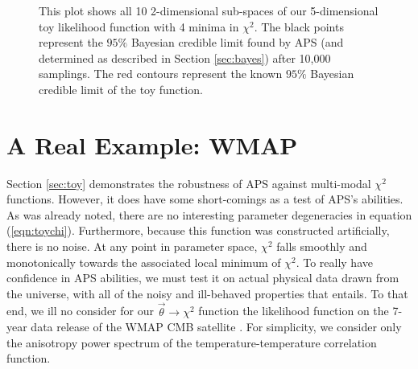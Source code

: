 \documentclass[useAMS,usenatbib]{aastex}
\begin{document}
\begin{figure*}
\caption{
This plot shows all 10 2-dimensional sub-spaces of our 5-dimensional toy likelihood
function with 4 minima in $\chi^2$.  The black points represent the $95\%$ Bayesian credible
limit found by APS (and determined as described in Section \ref{sec:bayes}) after 10,000
samplings.  The red contours represent the known $95\%$ Bayesian credible limit of the toy
function.
}
\label{fig:toyBayes4}
\end{figure*}

\section{A Real Example: WMAP}
\label{sec:wmap}

Section \ref{sec:toy} demonstrates the robustness of APS against multi-modal
$\chi^2$ functions.  However, it does have some short-comings as a test of
APS's abilities.  As was already noted, there are no interesting parameter
degeneracies in equation (\ref{eqn:toychi}).  Furthermore,
because this function was constructed artificially, there is no noise.  At
any point in parameter space, $\chi^2$ falls smoothly and monotonically towards
the associated local minimum of $\chi^2$.  To really have confidence in APS
abilities, we must test it on actual physical data drawn from the universe,
with all of the noisy and ill-behaved properties that entails.
To that end, we ill no consider for our $\vec{\theta}\rightarrow\chi^2$ 
function the likelihood function on the
7-year data release of the WMAP CMB satellite \cite{wmap7,wmap7likelihood}.
For simplicity, we consider only the anisotropy
power spectrum of the temperature-temperature correlation function.
\end{document}
